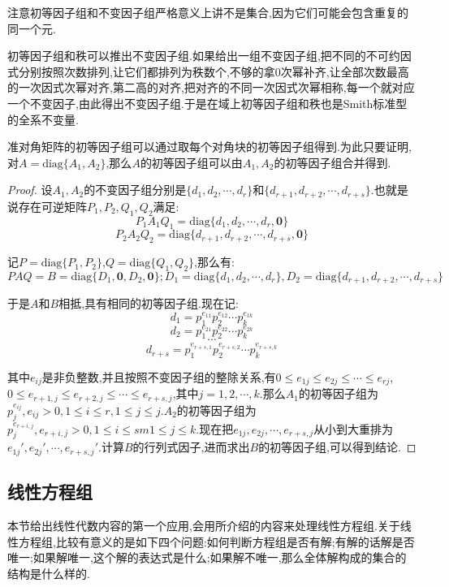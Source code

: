 注意初等因子组和不变因子组严格意义上讲不是集合,因为它们可能会包含重复的同一个元.

初等因子组和秩可以推出不变因子组.如果给出一组不变因子组,把不同的不可约因式分别按照次数排列,让它们都排列为秩数个,不够的拿0次幂补齐,让全部次数最高的一次因式次幂对齐,第二高的对齐,把对齐的不同一次因式次幂相称,每一个就对应一个不变因子,由此得出不变因子组.于是在域上初等因子组和秩也是Smith标准型的全系不变量.

准对角矩阵的初等因子组可以通过取每个对角块的初等因子组得到.为此只要证明,对$A=\mathrm{diag}\{A_1,A_2\}$,那么$A$的初等因子组可以由$A_1,A_2$的初等因子组合并得到.
\begin{proof}
	
	设$A_1,A_2$的不变因子组分别是$\{d_1,d_2,\cdots,d_r\}$和$\{d_{r+1},d_{r+2},\cdots,d_{r+s}\}$.也就是说存在可逆矩阵$P_1,P_2,Q_1,Q_2$满足:
	$$P_1A_1Q_1=\mathrm{diag}\{d_1,d_2,\cdots,d_r,\textbf{0}\}$$
	$$P_2A_2Q_2=\mathrm{diag}\{d_{r+1},d_{r+2},\cdots,d_{r+s},\textbf{0}\}$$
	
	记$P=\mathrm{diag}\{P_1,P_2\}$,$Q=\mathrm{diag}\{Q_1,Q_2\}$,那么有:
	$$PAQ=B=\mathrm{diag}\{D_1,\textbf{0},D_2,\textbf{0}\};D_1=\mathrm{diag}\{d_1,d_2,\cdots,d_r\},D_2=\mathrm{diag}\{d_{r+1},d_{r+2},\cdots,d_{r+s}\}$$
	
	于是$A$和$B$相抵,具有相同的初等因子组.现在记:
	$$d_1=p_1^{e_{11}}p_2^{e_{12}}\cdots p_k^{e_{1k}}$$
	$$d_2=p_1^{e_{21}}p_2^{e_{22}}\cdots p_k^{e_{2k}}$$
	$$\cdots$$
	$$d_{r+s}=p_1^{e_{r+s,1}}p_2^{e_{r+s,2}}\cdots p_k^{e_{r+s,k}}$$
	
	其中$e_{ij}$是非负整数,并且按照不变因子组的整除关系,有$0\le e_{1j}\le e_{2j}\le\cdots\le e_{rj}$,$0\le e_{r+1,j}\le e_{r+2,j}\le\cdots\le e_{r+s,j}$,其中$j=1,2,\cdots,k$.那么$A_1$的初等因子组为$p_j^{e_{ij}},e_{ij}>0,1\le i\le r,1\le j\le j$.$A_2$的初等因子组为$p_j^{e_{r+i,j}},e_{r+i,j}>0,1\le i\le sm1\le j\le k$.现在把$e_{1j},e_{2j},\cdots,e_{r+s,j}$从小到大重排为$e_{1j}',e_{2j}',\cdots,e_{r+s,j}'$.计算$B$的行列式因子,进而求出$B$的初等因子组,可以得到结论.
	
\end{proof}
\newpage
\subsection{线性方程组}

本节给出线性代数内容的第一个应用,会用所介绍的内容来处理线性方程组.关于线性方程组,比较有意义的是如下四个问题:如何判断方程组是否有解;有解的话解是否唯一;如果解唯一,这个解的表达式是什么;如果解不唯一,那么全体解构成的集合的结构是什么样的.

